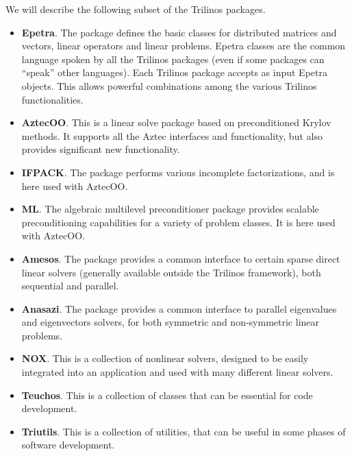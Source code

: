 We will describe the following subset of the Trilinos packages.
\begin{itemize} 
\item {\bf Epetra}. The package defines the basic classes for
  distributed matrices and vectors, linear operators and linear
  problems. Epetra classes are the common language spoken by all the
  Trilinos packages (even if some packages can ``speak'' other
  languages). Each Trilinos package accepts as input Epetra objects.
  This allows powerful combinations among the various Trilinos
  functionalities.
\item {\bf AztecOO}. This is a linear solve package based on
  preconditioned Krylov methods. It supports all the Aztec interfaces
  and functionality, but also provides significant new functionality.
\item {\bf IFPACK}. The package performs various incomplete
  factorizations, and is here used with AztecOO.
\item {\bf ML}. The algebraic multilevel preconditioner package provides
  scalable preconditioning capabilities for a variety of problem
  classes. It is here used with AztecOO.
\item {\bf Amesos}. The package provides a common interface to certain
  sparse direct linear solvers (generally available outside the Trilinos
  framework), both sequential and parallel.
\item {\bf Anasazi}. The package provides a common interface to
  parallel eigenvalues and eigenvectors solvers, for both symmetric and
  non-symmetric linear problems.
\item {\bf NOX}. This is a collection of nonlinear solvers, designed to
  be easily integrated into an application and used with many different
  linear solvers.
\item {\bf Teuchos}. This is a collection of classes that can be
  essential for code development.
\item {\bf Triutils}. This is a collection of utilities, that
  can be useful in some phases of software development.
\end{itemize}

